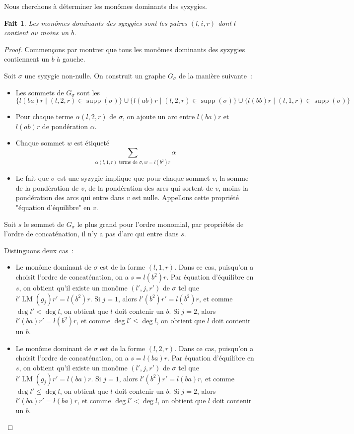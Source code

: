 \documentclass{article}
\newtheorem*{fact}{Fait}
\DeclareMathOperator{\LM}{LM}
\DeclareMathOperator{\supp}{supp}
\begin{document}
Nous cherchons à déterminer les monômes dominants des syzygies.
\begin{fact}
	Les monômes dominants des syzygies sont les paires $(l, i, r)$ dont $l$ contient au moins un $b$.
\end{fact}
\begin{proof}
	Commençons par montrer que tous les monômes dominants des syzygies contiennent un $b$ à gauche.
	
	Soit $\sigma$ une syzygie non-nulle.
	On construit un graphe $G_\sigma$ de la manière suivante~:
	\begin{itemize}
		\item Les sommets de $G_\sigma$ sont les 
		$$\{l(ba)r \;|\; (l, 2, r) \in \supp(\sigma)\} \cup \{l(ab)r \;|\; (l, 2, r) \in \supp(\sigma)\} \cup \{l(bb)r \;|\; (l, 1, r) \in \supp(\sigma)\}$$
		
		\item Pour chaque terme $\alpha(l, 2, r)$ de $\sigma$, on ajoute un arc entre $l(ba)r$ et $l(ab)r$ de pondération $\alpha$.
		\item Chaque sommet $w$ est étiqueté 
		$$\sum_{\alpha (l, 1, r) \mbox{ terme de } \sigma, w = l(b^2)r} \alpha$$
		\item Le fait que $\sigma$ est une syzygie implique que pour chaque sommet $v$, la somme de la pondération de $v$, de la pondération des arcs qui sortent de $v$, moins la pondération des arcs qui entre dans $v$ est nulle. Appellons cette propriété "équation d'équilibre" en $v$.
	\end{itemize}
	
	Soit $s$ le sommet de $G_\sigma$ le plus grand pour l'ordre monomial, par propriétés de l'ordre de concaténation, il n'y a pas d'arc qui entre dans $s$.
	
	Distinguons deux cas~:
	\begin{itemize}
	\item Le monôme dominant de $\sigma$ est de la forme $(l, 1, r)$. Dans ce cas, puisqu'on a choisit l'ordre de concaténation, on a $s = l(b^2)r$. Par équation d'équilibre en $s$, on obtient qu'il existe un monôme $(l', j, r')$ de $\sigma$ tel que $l'\LM(g_j)r' = l(b^2)r$.
	Si $j = 1$, alors $l'(b^2)r' = l(b^2)r$, et comme $\deg{l'} < \deg{l}$, on obtient que $l$ doit contenir un $b$.
	Si $j = 2$, alors $l'(ba)r' = l(b^2)r$, et comme $\deg{l'} \leq \deg{l}$, on obtient que $l$ doit contenir un $b$.
	
	\item Le monôme dominant de $\sigma$ est de la forme $(l, 2, r)$. Dans ce cas, puisqu'on a choisit l'ordre de concaténation, on a $s = l(ba)r$. Par équation d'équilibre en $s$, on obtient qu'il existe un monôme $(l', j, r')$ de $\sigma$ tel que $l'\LM(g_j)r' = l(ba)r$.
	Si $j = 1$, alors $l'(b^2)r' = l(ba)r$, et comme $\deg{l'} \leq \deg{l}$, on obtient que $l$ doit contenir un $b$.
	Si $j = 2$, alors $l'(ba)r' = l(ba)r$, et comme $\deg{l'} < \deg{l}$, on obtient que $l$ doit contenir un $b$.
	\end{itemize}
	

\end{proof}
\end{document}
